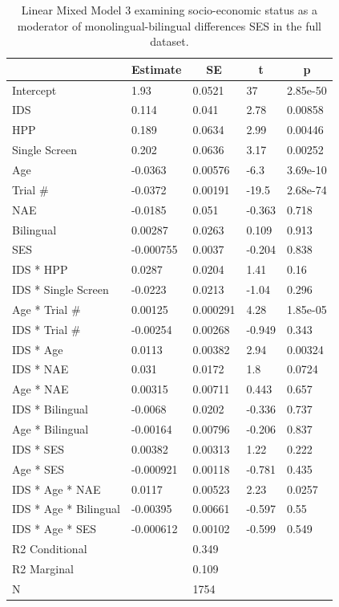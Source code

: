 \documentclass[
  english,
  ,man,floatsintext]{apa6}
\begin{document}
\begin{table}[tbp]
\begin{center}
\begin{threeparttable}
\caption{\label{tab:unnamed-chunk-15}Linear Mixed Model 3 examining socio-economic status as a moderator of monolingual-bilingual differences SES in the full dataset.}
\begin{tabular}{lllll}
\toprule
 & \multicolumn{1}{c}{Estimate} & \multicolumn{1}{c}{SE} & \multicolumn{1}{c}{t} & \multicolumn{1}{c}{p}\\
\midrule
Intercept & 1.93 & 0.0521 & 37 & 2.85e-50\\
IDS & 0.114 & 0.041 & 2.78 & 0.00858\\
HPP & 0.189 & 0.0634 & 2.99 & 0.00446\\
Single Screen & 0.202 & 0.0636 & 3.17 & 0.00252\\
Age & -0.0363 & 0.00576 & -6.3 & 3.69e-10\\
Trial \# & -0.0372 & 0.00191 & -19.5 & 2.68e-74\\
NAE & -0.0185 & 0.051 & -0.363 & 0.718\\
Bilingual & 0.00287 & 0.0263 & 0.109 & 0.913\\
SES & -0.000755 & 0.0037 & -0.204 & 0.838\\
IDS * HPP & 0.0287 & 0.0204 & 1.41 & 0.16\\
IDS * Single Screen & -0.0223 & 0.0213 & -1.04 & 0.296\\
Age * Trial \# & 0.00125 & 0.000291 & 4.28 & 1.85e-05\\
IDS * Trial \# & -0.00254 & 0.00268 & -0.949 & 0.343\\
IDS * Age & 0.0113 & 0.00382 & 2.94 & 0.00324\\
IDS * NAE & 0.031 & 0.0172 & 1.8 & 0.0724\\
Age * NAE & 0.00315 & 0.00711 & 0.443 & 0.657\\
IDS * Bilingual & -0.0068 & 0.0202 & -0.336 & 0.737\\
Age * Bilingual & -0.00164 & 0.00796 & -0.206 & 0.837\\
IDS * SES & 0.00382 & 0.00313 & 1.22 & 0.222\\
Age * SES & -0.000921 & 0.00118 & -0.781 & 0.435\\
IDS * Age * NAE & 0.0117 & 0.00523 & 2.23 & 0.0257\\
IDS * Age * Bilingual & -0.00395 & 0.00661 & -0.597 & 0.55\\
IDS * Age * SES & -0.000612 & 0.00102 & -0.599 & 0.549\\ \midrule
R2 Conditional &  & 0.349 &  & \\
R2 Marginal &  & 0.109 &  & \\ \midrule
N &  & 1754 &  & \\
\bottomrule
\end{tabular}
\end{threeparttable}
\end{center}
\end{table}
\end{document}

